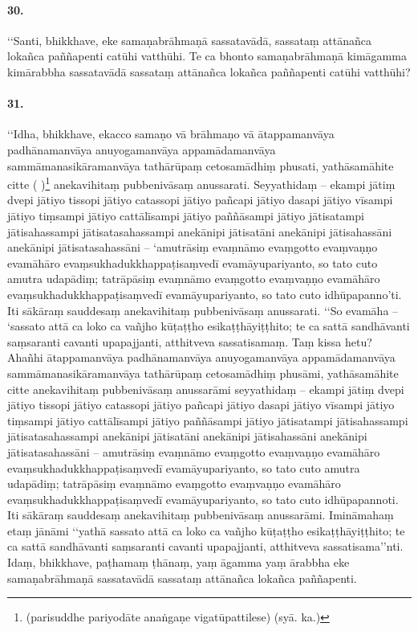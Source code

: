 \paragraph{30.}
‘‘Santi, bhikkhave, eke samaṇabrāhmaṇā sassatavādā, sassataṃ attānañca lokañca paññapenti catūhi vatthūhi. Te ca bhonto samaṇabrāhmaṇā kimāgamma kimārabbha sassatavādā sassataṃ attānañca lokañca paññapenti catūhi vatthūhi?

\paragraph{31.}
‘‘Idha, bhikkhave, ekacco samaṇo vā brāhmaṇo vā ātappamanvāya padhānamanvāya anuyogamanvāya appamādamanvāya sammāmanasikāramanvāya tathārūpaṃ cetosamādhiṃ phusati, yathāsamāhite citte ( )\footnote{(parisuddhe pariyodāte anaṅgaṇe vigatūpattilese) (syā. ka.)} anekavihitaṃ pubbenivāsaṃ anussarati. Seyyathidaṃ – ekampi jātiṃ dvepi jātiyo tissopi jātiyo catassopi jātiyo pañcapi jātiyo dasapi jātiyo vīsampi jātiyo tiṃsampi jātiyo cattālīsampi jātiyo paññāsampi jātiyo jātisatampi jātisahassampi jātisatasahassampi anekānipi jātisatāni anekānipi jātisahassāni anekānipi jātisatasahassāni – ‘amutrāsiṃ evaṃnāmo evaṃgotto evaṃvaṇṇo evamāhāro evaṃsukhadukkhappaṭisaṃvedī evamāyupariyanto, so tato cuto amutra udapādiṃ; tatrāpāsiṃ evaṃnāmo evaṃgotto evaṃvaṇṇo evamāhāro evaṃsukhadukkhappaṭisaṃvedī evamāyupariyanto, so tato cuto idhūpapanno’ti. Iti sākāraṃ sauddesaṃ anekavihitaṃ pubbenivāsaṃ anussarati. ‘‘So evamāha – ‘sassato attā ca loko ca vañjho kūṭaṭṭho esikaṭṭhāyiṭṭhito; te ca sattā sandhāvanti saṃsaranti cavanti upapajjanti, atthitveva sassatisamaṃ. Taṃ kissa hetu? Ahañhi ātappamanvāya padhānamanvāya anuyogamanvāya appamādamanvāya sammāmanasikāramanvāya tathārūpaṃ cetosamādhiṃ phusāmi, yathāsamāhite citte anekavihitaṃ pubbenivāsaṃ anussarāmi seyyathidaṃ – ekampi jātiṃ dvepi jātiyo tissopi jātiyo catassopi jātiyo pañcapi jātiyo dasapi jātiyo vīsampi jātiyo tiṃsampi jātiyo cattālīsampi jātiyo paññāsampi jātiyo jātisatampi jātisahassampi jātisatasahassampi anekānipi jātisatāni anekānipi jātisahassāni anekānipi jātisatasahassāni – amutrāsiṃ evaṃnāmo evaṃgotto evaṃvaṇṇo evamāhāro evaṃsukhadukkhappaṭisaṃvedī evamāyupariyanto, so tato cuto amutra udapādiṃ; tatrāpāsiṃ evaṃnāmo evaṃgotto evaṃvaṇṇo evamāhāro evaṃsukhadukkhappaṭisaṃvedī evamāyupariyanto, so tato cuto idhūpapannoti. Iti sākāraṃ sauddesaṃ anekavihitaṃ pubbenivāsaṃ anussarāmi. Imināmahaṃ etaṃ jānāmi ‘‘yathā sassato attā ca loko ca vañjho kūṭaṭṭho esikaṭṭhāyiṭṭhito; te ca sattā sandhāvanti saṃsaranti cavanti upapajjanti, atthitveva sassatisama’’nti. Idaṃ, bhikkhave, paṭhamaṃ ṭhānaṃ, yaṃ āgamma yaṃ ārabbha eke samaṇabrāhmaṇā sassatavādā sassataṃ attānañca lokañca paññapenti.

